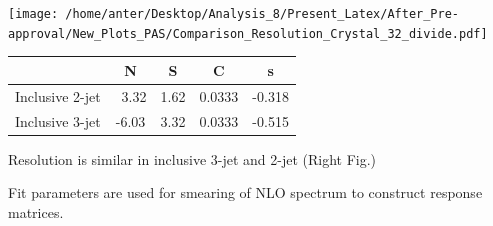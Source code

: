 \documentclass{beamer}
\begin{document}
\begin{frame}
\texttt{[image: /home/anter/Desktop/Analysis\_8/Present\_Latex/After\_Pre-approval/New\_Plots\_PAS/Comparison\_Resolution\_Crystal\_32\_divide.pdf]}\\
\vspace{2mm}
\begin{center}
\begin{table}[htbp]
\centering\scriptsize
\begin{tabular}{ccccc}
        \hline \hline
                 &    N    &  S   &    C   &    s   \\ \hline
Inclusive 2-jet  & ~3.32 & 1.62 & 0.0333 & -0.318  \\
Inclusive 3-jet  & -6.03 & 3.32 & 0.0333 & -0.515  \\
\hline \hline 
\end{tabular}
\end{table}
\vspace{2mm}
\begin{itemize}
 {\scriptsize \item Resolution is similar in inclusive 3-jet and 2-jet (Right Fig.)
\vspace{2mm}
 \item Fit parameters are used for smearing of NLO spectrum to construct response matrices. \\ }
\end{itemize}
\end{center}
\end{frame}
\end{document}

